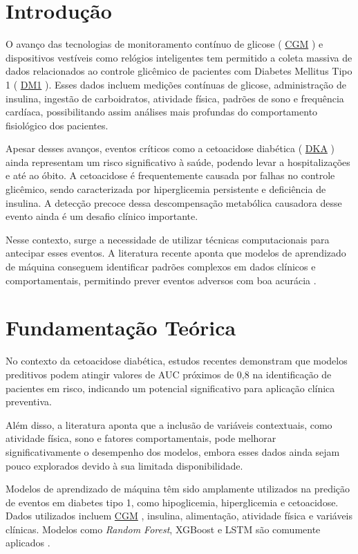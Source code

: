 \documentclass[12pt,a4paper]{article}
\DeclareRobustCommand{\sigla}[1]{%
    \texorpdfstring{\hyperlink{sigla:#1}{#1}}{#1}%
}
\begin{document}
\clearpage


\onehalfspacing
\section{Introdução}

O avanço das tecnologias de monitoramento contínuo de glicose (\sigla{CGM}) e dispositivos vestíveis como relógios inteligentes tem permitido a coleta massiva de dados relacionados ao controle glicêmico de pacientes com Diabetes Mellitus Tipo 1 (\sigla{DM1}). Esses dados incluem medições contínuas de glicose, administração de insulina, ingestão de carboidratos, atividade física, padrões de sono e frequência cardíaca, possibilitando assim análises mais profundas do comportamento fisiológico dos pacientes.

Apesar desses avanços, eventos críticos como a cetoacidose diabética (\sigla{DKA}) ainda representam um risco significativo à saúde, podendo levar a hospitalizações e até ao óbito. A cetoacidose é frequentemente causada por falhas no controle glicêmico, sendo caracterizada por hiperglicemia persistente e deficiência de insulina. A detecção precoce dessa descompensação metabólica causadora desse evento ainda é um desafio clínico importante.

Nesse contexto, surge a necessidade de utilizar técnicas computacionais para antecipar esses eventos. A literatura recente aponta que modelos de aprendizado de máquina conseguem identificar padrões complexos em dados clínicos e comportamentais, permitindo prever eventos adversos com boa acurácia \cite{alsamhori2025,cichosz2025}.

\section{Fundamentação Teórica}

No contexto da cetoacidose diabética, estudos recentes demonstram que modelos preditivos podem atingir valores de AUC próximos de 0,8 na identificação de pacientes em risco, indicando um potencial significativo para aplicação clínica preventiva.

Além disso, a literatura aponta que a inclusão de variáveis contextuais, como atividade física, sono e fatores comportamentais, pode melhorar significativamente o desempenho dos modelos, embora esses dados ainda sejam pouco explorados devido à sua limitada disponibilidade.

Modelos de aprendizado de máquina têm sido amplamente utilizados na predição de eventos em diabetes tipo 1, como hipoglicemia, hiperglicemia e cetoacidose. Dados utilizados incluem \sigla{CGM}, insulina, alimentação, atividade física e variáveis clínicas. Modelos como \textit{Random Forest}, XGBoost e LSTM são comumente aplicados \cite{alsamhori2025,cichosz2025}.
\end{document}
